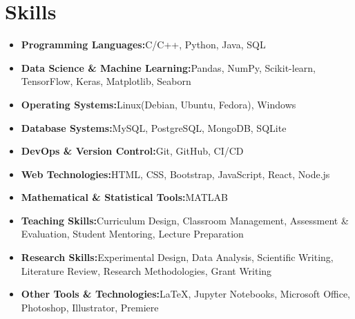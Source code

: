 \documentclass[a4paper,11pt]{article}
\makeatletter
\newcommand{\resumeItem}[2]{
	\item{
		\textbf{#1}{\hspace{0.5mm}#2 \vspace{-0.5mm}}
	}
}
\newcommand{\resumePOR}[3]{
	\vspace{0.5mm}\item
	\begin{tabular*}{0.97\textwidth}[t]{l@{\extracolsep{\fill}}r}
		\textbf{#1}\hspace{0.3mm}#2 & \textit{\small{#3}} 
	\end{tabular*}
	\vspace{-2mm}
}
\newcommand{\resumeSubItem}[2]{\resumeItem{#1}{#2}\vspace{-4pt}}
\newcommand{\resumeSubHeadingListStart}{\begin{itemize}[leftmargin=*,labelsep=1mm]}
\newcommand{\resumeHeadingSkillStart}{\begin{itemize}[leftmargin=*,itemsep=1.7mm, rightmargin=2ex]}
\newcommand{\resumeSubHeadingListEnd}{\end{itemize}\vspace{2mm}}
\newcommand{\resumeHeadingSkillEnd}{\end{itemize}\vspace{-2mm}}
\makeatother
\begin{document}
	\begin{comment}
	\section{\textbf{Professional Memberships}}
	\vspace{-0.4mm}
	\resumeSubHeadingListStart
	\resumePOR{Professional Organization A}
	{, Membership ID: XXXXXXXX}
	{Month Year - Present}
	\resumePOR{Professional Organization B}
	{, \href{https://membership-certificate-link.com}{Membership ID: XXXXXXXX}}
	{Month Year - Present}
	\resumePOR{Professional Organization C}
	{, \href{https://membership-certificate-link.com}{Membership ID: XXXXXXXX}}
	{Month Year - Present}
	
	\resumeSubHeadingListEnd
	\vspace{-6mm}
	
	\section{\textbf{Certifications}}
	\vspace{-0.2mm}
	\resumeSubHeadingListStart
	\resumePOR{}{\href{https://certification-link-a.com}{
			\textbf{Certification A}
	}}{Month Year}
	\resumePOR{}{
		\textbf{Certifying Body:} {{\href{https://certification-link-b.com}{Certification B}}}}{Month Year}
	\resumePOR{}{
		\textbf{Certifying Body:} {{\href{https://certification-link-c.com}{Certification C}}}}{Month Year}
	\resumePOR{}{\href{https://certification-link-d.com}{
			\textbf{Certification D}
	}}{Month Year}
	
	\resumeSubHeadingListEnd
	\vspace{-6mm}
	\end{comment}

	\section{\textbf{Skills}}
	\vspace{1mm}
	\resumeHeadingSkillStart
	\resumeSubItem{Programming Languages:}
	{C/C++, Python, Java, SQL}
	\resumeSubItem{Data Science \& Machine Learning:}
	{Pandas, NumPy, Scikit-learn, TensorFlow, Keras, Matplotlib, Seaborn}
	\resumeSubItem{Operating Systems:}
	{Linux(Debian, Ubuntu, Fedora), Windows}
	\resumeSubItem{Database Systems:}
	{MySQL, PostgreSQL, MongoDB, SQLite}
	\resumeSubItem{DevOps \& Version Control:}
	{Git, GitHub, CI/CD}
	\resumeSubItem{Web Technologies:}
	{HTML, CSS, Bootstrap, JavaScript, React, Node.js}
	\resumeSubItem{Mathematical \& Statistical Tools:}
	{MATLAB}
	\resumeSubItem{Teaching Skills:}
	{Curriculum Design, Classroom Management, Assessment \& Evaluation, Student Mentoring, Lecture Preparation}
	\resumeSubItem{Research Skills:}
	{Experimental Design, Data Analysis, Scientific Writing, Literature Review, Research Methodologies, Grant Writing}
	\resumeSubItem{Other Tools \& Technologies:}
	{LaTeX, Jupyter Notebooks, Microsoft Office, Photoshop, Illustrator, Premiere}
	\resumeHeadingSkillEnd
\end{document}
